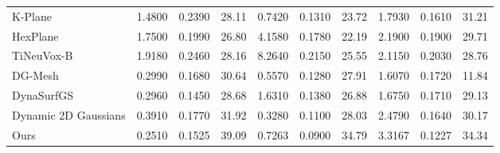 \begin{table}[]
\begin{tabular}{@{}lccccccccc@{}}
K-Plane & 1.4800 & 0.2390 & 28.11 & 0.7420 & 0.1310 & 23.72 & 1.7930 & \cellcolor[HTML]{FAC791}0.1610 & \cellcolor[HTML]{FAC791}31.21 \\
HexPlane & 1.7500 & 0.1990 & 26.80 & 4.1580 & 0.1780 & 22.19 & 2.1900 & 0.1900 & 29.71 \\
TiNeuVox-B & 1.9180 & 0.2460 & 28.16 & 8.2640 & 0.2150 & 25.55 & 2.1150 & 0.2030 & 28.76 \\
DG-Mesh & \cellcolor[HTML]{FFFF8F}0.2990 & \cellcolor[HTML]{FFFF8F}0.1680 & \cellcolor[HTML]{FFFF8F}30.64 & \cellcolor[HTML]{FAC791}0.5570 & \cellcolor[HTML]{FFFF8F}0.1280 & \cellcolor[HTML]{FFFF8F}27.91 & \cellcolor[HTML]{F59194}1.6070 & 0.1720 & 11.84 \\
DynaSurfGS & \cellcolor[HTML]{FAC791}0.2960 & \cellcolor[HTML]{F59194}0.1450 & 28.68 & 1.6310 & 0.1380 & 26.88 & \cellcolor[HTML]{FAC791}1.6750 & 0.1710 & 29.13 \\
Dynamic 2D Gaussians & 0.3910 & 0.1770 & \cellcolor[HTML]{FAC791}31.92 & \cellcolor[HTML]{F59194}0.3280 & \cellcolor[HTML]{FAC791}0.1100 & \cellcolor[HTML]{FAC791}28.03 & 2.4790 & \cellcolor[HTML]{FFFF8F}0.1640 & \cellcolor[HTML]{FFFF8F}30.17 \\
Ours & \cellcolor[HTML]{F59194}0.2510 & \cellcolor[HTML]{FAC791}0.1525 & \cellcolor[HTML]{F59194}39.09 & \cellcolor[HTML]{FFFF8F}0.7263 & \cellcolor[HTML]{F59194}0.0900 & \cellcolor[HTML]{F59194}34.79 & 3.3167 & \cellcolor[HTML]{F59194}0.1227 & \cellcolor[HTML]{F59194}34.34 \\ \bottomrule
\end{tabular}%
\end{table}
